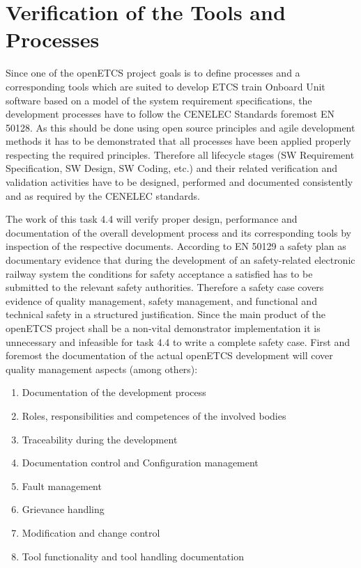 \section{Verification of the Tools and Processes}
Since one of the openETCS project goals is to define processes and a corresponding tools which are suited to develop ETCS train Onboard Unit software based on a model of the system requirement specifications, the development processes have to follow the CENELEC Standards foremost EN 50128. As this should be done using open source principles and agile development methods it has to be demonstrated that all processes have been applied properly respecting the required principles. Therefore all lifecycle stages (SW Requirement Specification, SW Design, SW Coding, etc.) and their related verification and validation activities have to be designed, performed and documented consistently and as required by the CENELEC standards. 

The work of this task 4.4 will verify proper design, performance and documentation of the overall development process and its corresponding tools by inspection of the respective documents. According to EN 50129 a safety plan as documentary evidence that during the development of an safety-related electronic railway system the conditions for safety acceptance a satisfied has to be submitted to the relevant safety authorities. Therefore a safety case covers evidence of quality management, safety management, and functional and technical safety in a structured justification. Since  the main product of the openETCS project shall be a non-vital demonstrator implementation it is unnecessary and infeasible for task 4.4 to write a complete safety case. First and foremost the documentation of the actual openETCS development will cover quality management aspects (among others):
\begin{enumerate}
\item  Documentation of the development process
\item  Roles, responsibilities and competences of the involved bodies
\item  Traceability during the development
\item  Documentation control and Configuration management
\item  Fault management
\item  Grievance handling
\item  Modification and change control
\item  Tool functionality and tool handling documentation
\end{enumerate}

